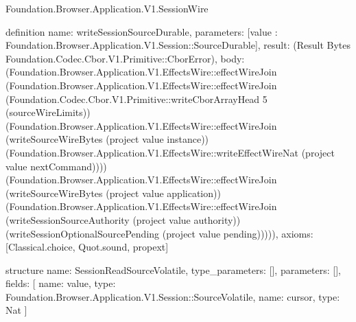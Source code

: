 \begin{lexlean}{Foundation.Browser.Application.V1.SessionWire}
\begin{semanticmodule}
definition{
  name: writeSessionSourceDurable,
  parameters: [value : Foundation.Browser.Application.V1.Session::SourceDurable],
  result: (Result Bytes Foundation.Codec.Cbor.V1.Primitive::CborError),
  body: (Foundation.Browser.Application.V1.EffectsWire::effectWireJoin (Foundation.Browser.Application.V1.EffectsWire::effectWireJoin (Foundation.Codec.Cbor.V1.Primitive::writeCborArrayHead 5 (sourceWireLimits)) (Foundation.Browser.Application.V1.EffectsWire::effectWireJoin (writeSourceWireBytes (project value instance)) (Foundation.Browser.Application.V1.EffectsWire::writeEffectWireNat (project value nextCommand)))) (Foundation.Browser.Application.V1.EffectsWire::effectWireJoin (writeSourceWireBytes (project value application)) (Foundation.Browser.Application.V1.EffectsWire::effectWireJoin (writeSessionSourceAuthority (project value authority)) (writeSessionOptionalSourcePending (project value pending))))),
  axioms: [Classical.choice, Quot.sound, propext]
}

structure{
  name: SessionReadSourceVolatile,
  type_parameters: [],
  parameters: [],
  fields: [
    {name: value, type: Foundation.Browser.Application.V1.Session::SourceVolatile},
    {name: cursor, type: Nat}
  ]
}


\end{semanticmodule}
\end{lexlean}
